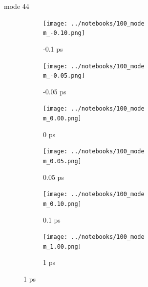 \documentclass{beamer}
\newcommand\w{0.32}
\begin{document}
\renewcommand\m{44}
\begin{frame}{mode \m}
	\begin{figure}
		\centering
		\begin{subfigure}[b]{\w\textwidth}
			\centering
			\texttt{[image: ../notebooks/100\_mode\\m\_-0.10.png]}
			\caption{-0.1 ps}
		\end{subfigure}
		\begin{subfigure}[b]{\w\textwidth}
			\centering
			\texttt{[image: ../notebooks/100\_mode\\m\_-0.05.png]}
			\caption{-0.05 ps}
		\end{subfigure}
		\begin{subfigure}[b]{\w\textwidth}
			\centering
			\texttt{[image: ../notebooks/100\_mode\\m\_0.00.png]}
			\caption{0 ps}
		\end{subfigure}
		\begin{subfigure}[b]{\w\textwidth}
			\centering
			\texttt{[image: ../notebooks/100\_mode\\m\_0.05.png]}
			\caption{0.05 ps}
		\end{subfigure}
		\begin{subfigure}[b]{\w\textwidth}
			\centering
			\texttt{[image: ../notebooks/100\_mode\\m\_0.10.png]}
			\caption{0.1 ps}
		\end{subfigure}
		\begin{subfigure}[b]{\w\textwidth}
			\centering
			\texttt{[image: ../notebooks/100\_mode\\m\_1.00.png]}
			\caption{1 ps}
		\end{subfigure}
	\end{figure}
\end{frame}
\end{document}
